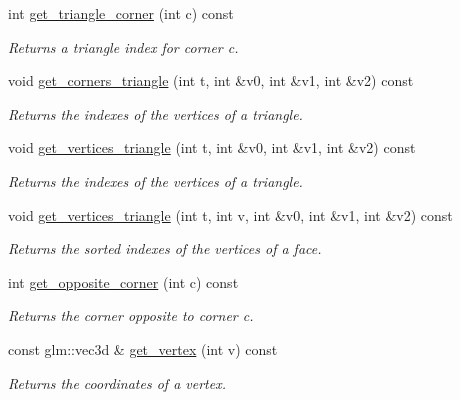 \begin{DoxyCompactItemize}
int \hyperlink{classgeoproc_1_1TriangleMesh_a8f4d4fc9ea8c907d154605eee686807e}{get\+\_\+triangle\+\_\+corner} (int c) const
\begin{DoxyCompactList}\small\item\em Returns a triangle index for corner {\itshape c}. \end{DoxyCompactList}\item 
void \hyperlink{classgeoproc_1_1TriangleMesh_acd89c54ec14ddfb5d38f1baedb717fc2}{get\+\_\+corners\+\_\+triangle} (int t, int \&v0, int \&v1, int \&v2) const
\begin{DoxyCompactList}\small\item\em Returns the indexes of the vertices of a triangle. \end{DoxyCompactList}\item 
void \hyperlink{classgeoproc_1_1TriangleMesh_aab448f6f589f4c329b4daca635d9d865}{get\+\_\+vertices\+\_\+triangle} (int t, int \&v0, int \&v1, int \&v2) const
\begin{DoxyCompactList}\small\item\em Returns the indexes of the vertices of a triangle. \end{DoxyCompactList}\item 
void \hyperlink{classgeoproc_1_1TriangleMesh_af315fcda4f23dc0f3e9041e6d6d24601}{get\+\_\+vertices\+\_\+triangle} (int t, int v, int \&v0, int \&v1, int \&v2) const
\begin{DoxyCompactList}\small\item\em Returns the sorted indexes of the vertices of a face. \end{DoxyCompactList}\item 
int \hyperlink{classgeoproc_1_1TriangleMesh_a0ea38352c56a76d6def1fce67253f433}{get\+\_\+opposite\+\_\+corner} (int c) const
\begin{DoxyCompactList}\small\item\em Returns the corner opposite to corner c. \end{DoxyCompactList}\item 
const glm\+::vec3d \& \hyperlink{classgeoproc_1_1TriangleMesh_adc5168f8557856f574bc1c3533550b3e}{get\+\_\+vertex} (int v) const
\begin{DoxyCompactList}\small\item\em Returns the coordinates of a vertex. \end{DoxyCompactList}\item 
\mbox{\label{classgeoproc_1_1TriangleMesh_a0398e2ed3a068164cf4d8f7be6dcd75b}} 

\end{DoxyCompactItemize}
